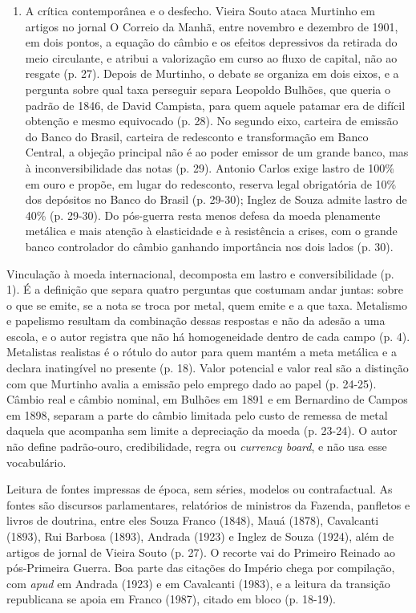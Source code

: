 \begin{enumerate}[leftmargin=*,nosep]
\item A crítica contemporânea e o desfecho. Vieira Souto ataca Murtinho em
artigos no jornal O Correio da Manhã, entre novembro e dezembro de 1901,
em dois pontos, a equação do câmbio e os efeitos depressivos da retirada do
meio circulante, e atribui a valorização em curso ao fluxo de capital, não ao
resgate (p. 27). Depois de Murtinho, o debate se organiza em dois eixos, e a
pergunta sobre qual taxa perseguir separa Leopoldo Bulhões, que queria o padrão
de 1846, de David Campista, para quem aquele patamar era de difícil obtenção e
mesmo equivocado (p. 28). No segundo eixo, carteira de emissão do Banco do
Brasil, carteira de redesconto e transformação em Banco Central, a objeção
principal não é ao poder emissor de um grande banco, mas à inconversibilidade
das notas (p. 29). Antonio Carlos exige lastro de 100\% em ouro e propõe, em
lugar do redesconto, reserva legal obrigatória de 10\% dos depósitos no Banco do
Brasil (p. 29-30); Inglez de Souza admite lastro de 40\% (p. 29-30). Do pós-guerra
resta menos defesa da moeda plenamente metálica e mais atenção à elasticidade e
à resistência a crises, com o grande banco controlador do câmbio ganhando
importância nos dois lados (p. 30).
\end{enumerate}


Vinculação à moeda internacional, decomposta em lastro e conversibilidade
(p. 1). É a definição que separa quatro perguntas que costumam andar juntas:
sobre o que se emite, se a nota se troca por metal, quem emite e a que taxa.
Metalismo e papelismo resultam da combinação dessas respostas e não da adesão a
uma escola, e o autor registra que não há homogeneidade dentro de cada campo
(p. 4). Metalistas realistas é o rótulo do autor para quem mantém a meta
metálica e a declara inatingível no presente (p. 18). Valor potencial e valor
real são a distinção com que Murtinho avalia a emissão pelo emprego dado ao
papel (p. 24-25). Câmbio real e câmbio nominal, em Bulhões em 1891 e em
Bernardino de Campos em 1898, separam a parte do câmbio limitada pelo custo de
remessa de metal daquela que acompanha sem limite a depreciação da moeda
(p. 23-24). O autor não define padrão-ouro, credibilidade, regra ou
\emph{currency board}, e não usa esse vocabulário.

Leitura de fontes impressas de época, sem séries, modelos ou contrafactual.
As fontes são discursos parlamentares, relatórios de ministros da Fazenda,
panfletos e livros de doutrina, entre eles Souza Franco (1848), Mauá (1878),
Cavalcanti (1893), Rui Barbosa (1893), Andrada (1923) e Inglez de Souza (1924),
além de artigos de jornal de Vieira Souto (p. 27). O recorte vai do Primeiro
Reinado ao pós-Primeira Guerra. Boa parte das citações do Império chega por
compilação, com \emph{apud} em Andrada (1923) e em Cavalcanti (1983), e a
leitura da transição republicana se apoia em Franco (1987), citado em bloco
(p. 18-19).

